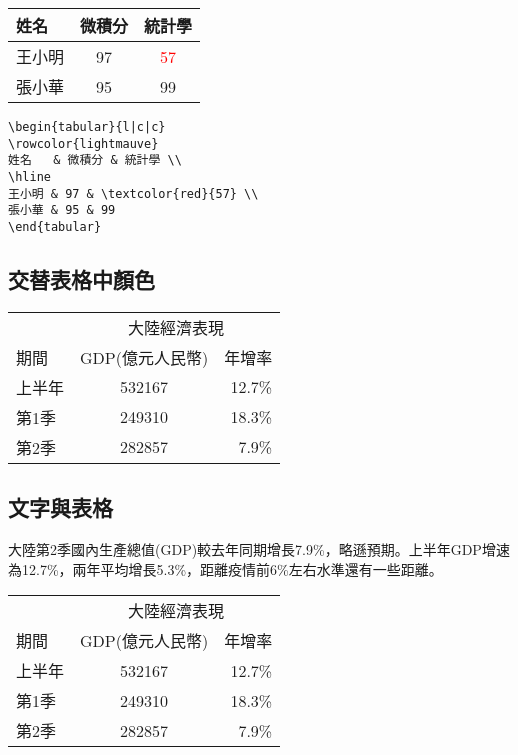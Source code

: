 \begin{minipage}[c]{0.4\linewidth}
\begin{tabular}{l|c|c}   
\rowcolor{lightmauve}
姓名   & 微積分 & 統計學 \\ 
\hline
王小明 & 97 & \textcolor{red}{57} \\ 
張小華 & 95 & 99   
\end{tabular}
\end{minipage}
\begin{minipage}[c]{0.6\linewidth}
\begin{verbatim}
\begin{tabular}{l|c|c}   
\rowcolor{lightmauve}
姓名   & 微積分 & 統計學 \\ 
\hline
王小明 & 97 & \textcolor{red}{57} \\  
張小華 & 95 & 99 
\end{tabular}
\end{verbatim}
\end{minipage}\bigskip
\subsection{交替表格中顏色}
\begin{center}
\begin{tabular}{lcr}
\hline
        & \multicolumn{2}{c}{大陸經濟表現}\\\cline{2-3}
期間    	& GDP(億元人民幣)   & 年增率 	\\\hline\rowcolor{classicrose}
上半年 	& 532167   	      & 12.7\% 	\\\rowcolor{cream}
第1季 	& 249310   	      & 18.3\%    \\\rowcolor{classicrose}
第2季 	& 282857   	      & 7.9\% 	\\
\hline
\end{tabular}
\end{center}
\subsection{文字與表格}
\begin{minipage}{.35\linewidth}
\bigskip 
大陸第2季國內生產總值(GDP)較去年同期增長7.9\%，略遜預期。上半年GDP增速為12.7\%，兩年平均增長5.3\%，距離疫情前6\%左右水準還有一些距離。
\end{minipage}\hfill
\begin{minipage}{.55\linewidth}
\centering
\begin{tabular}{lcr}
\hline
        & \multicolumn{2}{c}{大陸經濟表現}\\\cline{2-3}
期間    	& GDP(億元人民幣)   & 年增率 	\\\hline\rowcolor{classicrose}
上半年 	& 532167   	      & 12.7\% 	\\\rowcolor{cream}
第1季 	& 249310   	      & 18.3\%    \\\rowcolor{classicrose}
第2季 	& 282857   	      & 7.9\% 	\\
\hline
\end{tabular}
\end{minipage}\bigskip

